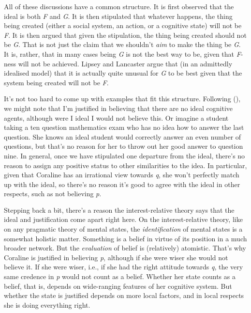 \documentclass[
  10pt,
  letterpaper,
  DIV=11,
  numbers=noendperiod,
  twoside]{scrartcl}
\begin{document}
All of these discussions have a common structure. It is first observed
that the ideal is both \emph{F} and \emph{G}. It is then stipulated that
whatever happens, the thing being created (either a social system, an
action, or a cognitive state) will not be \emph{F}. It is then argued
that given the stipulation, the thing being created should not be
\emph{G}. That is not just the claim that we shouldn't \emph{aim} to
make the thing be \emph{G}. It is, rather, that in many cases being
\emph{G} is not the best way to be, given that \emph{F}-ness will not be
achieved. Lipsey and Lancaster argue that (in an admittedly idealised
model) that it is actually quite unusual for \emph{G} to be best given
that the system being created will not be \emph{F}.

It's not too hard to come up with examples that fit this structure.
Following (),
we might note that I'm justified in believing that there are no ideal
cognitive agents, although were I ideal I would not believe this. Or
imagine a student taking a ten question mathematics exam who has no idea
how to answer the last question. She knows an ideal student would
correctly answer an even number of questions, but that's no reason for
her to throw out her good answer to question nine. In general, once we
have stipulated one departure from the ideal, there's no reason to
assign any positive status to other similarities to the idea. In
particular, given that Coraline has an irrational view towards \emph{q},
she won't perfectly match up with the ideal, so there's no reason it's
good to agree with the ideal in other respects, such as not believing
\emph{p}.

Stepping back a bit, there's a reason the interest-relative theory says
that the ideal and justification come apart right here. On the
interest-relative theory, like on any pragmatic theory of mental states,
the \emph{identification} of mental states is a somewhat holistic
matter. Something is a belief in virtue of its position in a much
broader network. But the \emph{evaluation} of belief is (relatively)
atomistic. That's why Coraline is justified in believing \emph{p},
although if she were wiser she would not believe it. If she were wiser,
i.e., if she had the right attitude towards \emph{q}, the very same
credence in \emph{p} would not count as a belief. Whether her state
counts as a belief, that is, depends on wide-ranging features of her
cognitive system. But whether the state is justified depends on more
local factors, and in local respects she is doing everything right.
\end{document}
